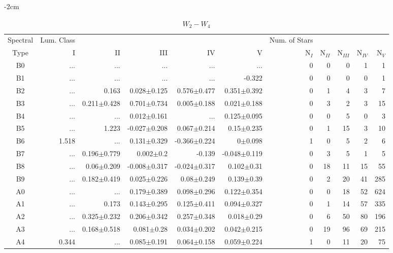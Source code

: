 \begin{table}[t]
\tiny
\centering
\caption{$W_{2}-W_{4}$}
\begin{center}
    \addtolength{\leftskip} {-2cm}
    \addtolength{\rightskip}{-2cm}
    \begin{tabular}{c|rrrrr|rrrrr}
    \toprule
    Spectral & Lum. Class & & & & & Num. of Stars & & & &  \\
    Type & I & II & III &  IV & V & N$_{I}$ & N$_{II}$ & N$_{III}$ & N$_{IV}$ & N$_{V}$ \\ \midrule
  
B0	&	 ...	&	 ...	&	 ...	&	 ...	&	 ...	&	0	&	0	&	0	&	1	&	1	\\
B1	&	 ...	&	 ...	&	 ...	&	 ...	&	-0.322	&	0	&	0	&	0	&	0	&	1	\\
B2	&	 ...	&	0.163	&	0.028$\pm$0.125	&	0.576$\pm$0.477	&	0.351$\pm$0.392	&	0	&	1	&	4	&	3	&	7	\\
B3	&	 ...	&	0.211$\pm$0.428	&	0.701$\pm$0.734	&	0.005$\pm$0.188	&	0.021$\pm$0.188	&	0	&	3	&	2	&	3	&	15	\\
B4	&	 ...	&	 ...	&	0.012$\pm$0.161	&	 ...	&	0.125$\pm$0.095	&	0	&	0	&	5	&	0	&	3	\\
B5	&	 ...	&	1.223	&	-0.027$\pm$0.208	&	0.067$\pm$0.214	&	0.15$\pm$0.235	&	0	&	1	&	15	&	3	&	10	\\
B6	&	1.518	&	 ...	&	0.131$\pm$0.329	&	-0.366$\pm$0.224	&	0$\pm$0.098	&	1	&	0	&	5	&	2	&	6	\\
B7	&	 ...	&	0.196$\pm$0.779	&	0.002$\pm$0.2	&	-0.139	&	-0.048$\pm$0.119	&	0	&	3	&	5	&	1	&	5	\\
B8	&	 ...	&	0.06$\pm$0.209	&	-0.008$\pm$0.317	&	-0.024$\pm$0.317	&	0.102$\pm$0.31	&	0	&	18	&	11	&	15	&	55	\\
B9	&	 ...	&	0.182$\pm$0.419	&	0.025$\pm$0.226	&	0.08$\pm$0.249	&	0.139$\pm$0.39	&	0	&	2	&	20	&	41	&	285	\\
A0	&	 ...	&	 ...	&	0.179$\pm$0.389	&	0.098$\pm$0.296	&	0.122$\pm$0.354	&	0	&	0	&	18	&	52	&	624	\\
A1	&	 ...	&	0.173	&	0.143$\pm$0.295	&	0.125$\pm$0.411	&	0.094$\pm$0.327	&	0	&	1	&	14	&	57	&	335	\\
A2	&	 ...	&	0.325$\pm$0.232	&	0.206$\pm$0.342	&	0.257$\pm$0.348	&	0.018$\pm$0.29	&	0	&	6	&	50	&	80	&	196	\\
A3	&	 ...	&	0.168$\pm$0.518	&	0.081$\pm$0.28	&	0.034$\pm$0.202	&	0.042$\pm$0.215	&	0	&	19	&	96	&	69	&	215	\\
A4	&	0.344	&	 ...	&	0.085$\pm$0.191	&	0.064$\pm$0.158	&	0.059$\pm$0.224	&	1	&	0	&	11	&	20	&	75	\\

\end{tabular}
\end{center}
\end{table}

